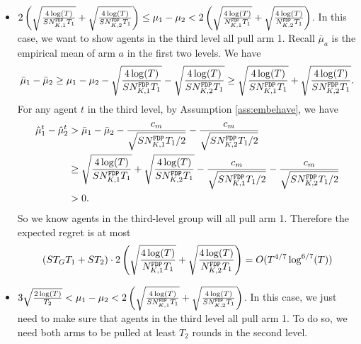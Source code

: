 {\begin{itemize}
Now consider the agents in the third level group. Recall $\bar{\mu}_a$ is the empirical mean of arm $a$ in the history they see. We have
\[
\bar{\mu}_1 - \bar{\mu}_2 \geq \mu_1 -\mu_2 - \sqrt{\frac{4\log(T)}{S\fdpN[1]T_1}} - \sqrt{\frac{4\log(T)}{S\fdpN[2]T_1}} \geq  \sqrt{\frac{4\log(T)}{\fdpN[1]T_1}} 
+ \sqrt{\frac{4\log(T)}{\fdpN[2]T_1}}.
\]
Similarly as above, by Assumption \ref{ass:embehave}, we know $\hat{\mu}_1^t - \hat{\mu}_2^t > 0$ for any agent $t$ in the third level. So we know agents in the third-level group will all pull arm 1. Therefore the expected regret is at most $S T_G T_1 = O(T^{4/7} \log^{6/7}(T))$. 


\item $2\left(\sqrt{\frac{4\log(T)}{S\fdpN[1]T_1}} 
+ \sqrt{\frac{4\log(T)}{S\fdpN[2]T_1}}\right) \leq \mu_1-\mu_2 < 2\left(\sqrt{\frac{4\log(T)}{\fdpN[1]T_1}} 
+ \sqrt{\frac{4\log(T)}{\fdpN[2]T_1}}\right)$. In this case, we want to show agents in the third level all pull arm 1. Recall $\bar{\mu}_a$ is the empirical mean of arm $a$ in the first two levels. We have
\[
\bar{\mu}_1 - \bar{\mu}_2 \geq \mu_1 -\mu_2 - \sqrt{\frac{4\log(T)}{S\fdpN[1]T_1}} - \sqrt{\frac{4\log(T)}{S\fdpN[2]T_1}} \geq  \sqrt{\frac{4\log(T)}{S\fdpN[1]T_1}} 
+ \sqrt{\frac{4\log(T)}{S\fdpN[2]T_1}}.
\]
For any agent $t$ in the third level, by Assumption \ref{ass:embehave}, we have
\begin{align*}
\hat{\mu}_1^t - \hat{\mu}_2^t &>\bar{\mu}_1 - \bar{\mu}_2 - \frac{c_m}{\sqrt{S\fdpN[1]T_1/2}} - \frac{c_m}{\sqrt{S\fdpN[2]T_1/2}}\\
&\geq  \sqrt{\frac{4\log(T)}{S\fdpN[1]T_1}} + \sqrt{\frac{4\log(T)}{S\fdpN[2]T_1}}- \frac{c_m}{\sqrt{S\fdpN[1]T_1/2}} - \frac{c_m}{\sqrt{S\fdpN[2]T_1/2}}\\
 &> 0.
\end{align*}
So we know agents in the third-level group will all pull arm 1. Therefore the expected regret is at most 
\[
(S T_G T_1 + S T_2) \cdot 2\left(\sqrt{\frac{4\log(T)}{\fdpN[1]T_1}} 
+ \sqrt{\frac{4\log(T)}{\fdpN[2]T_1}}\right) = O(T^{4/7} \log^{6/7}(T))
\]

\item $ 3\sqrt{\frac{2\log(T)}{T_2}} < \mu_1-\mu_2 < 2\left(\sqrt{\frac{4\log(T)}{S\fdpN[1]T_1}} 
+ \sqrt{\frac{4\log(T)}{S\fdpN[2]T_1}}\right)$. In this case, we just need to make sure that agents in the third level all pull arm 1. To do so, we need both arms to be pulled at least $T_2$ rounds in the second level.  


\end{itemize}}
